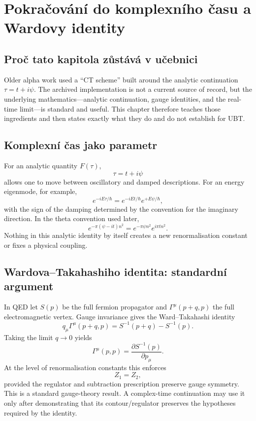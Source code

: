 
\chapter{Pokračování do komplexního času a Wardovy identity}
\label{ch:ct-scheme}

\section{Proč tato kapitola zůstává v učebnici}
Older alpha work used a ``CT scheme'' built around the analytic continuation
\(\tau=t+i\psi\).  The archived implementation is not a current source of
record, but the underlying mathematics---analytic continuation, gauge
identities, and the real-time limit---is standard and useful.  This chapter
therefore teaches those ingredients and then states exactly what they do and do
not establish for UBT.

\section{Komplexní čas jako parametr}
For an analytic quantity $F(\tau)$,
\[
 \tau=t+i\psi
\]
allows one to move between oscillatory and damped descriptions.  For an energy
eigenmode, for example,
\[
 e^{-iE\tau/\hbar}=e^{-iEt/\hbar}e^{+E\psi/\hbar},
\]
with the sign of the damping determined by the convention for the imaginary
direction.  In the theta convention used later,
\[
 e^{-\pi(\psi-it)n^2}
 =e^{-\pi\psi n^2}e^{i\pi t n^2}.
\]
Nothing in this analytic identity by itself creates a new renormalisation
constant or fixes a physical coupling.

\section{Wardova--Takahashiho identita: standardní argument}
In QED let $S(p)$ be the full fermion propagator and
$\Gamma^\mu(p+q,p)$ the full electromagnetic vertex.  Gauge invariance gives
the Ward--Takahashi identity
\[
 q_\mu\Gamma^\mu(p+q,p)
 =S^{-1}(p+q)-S^{-1}(p).
\]
Taking the limit $q\to0$ yields
\[
 \Gamma^\mu(p,p)=\frac{\partial S^{-1}(p)}{\partial p_\mu}.
\]
At the level of renormalisation constants this enforces
\[
 \boxed{Z_1=Z_2,}
\]
provided the regulator and subtraction prescription preserve gauge symmetry.
This is a standard gauge-theory result.  A complex-time continuation may use
it only after demonstrating that its contour/regulator preserves the hypotheses
required by the identity.

